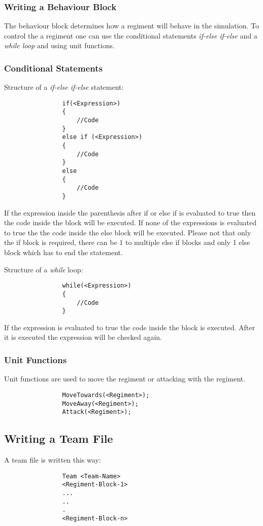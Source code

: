 		\subsubsection{Writing a Behaviour Block}
			The behaviour block determines how a regiment will behave in the simulation. To control the a regiment one can 
			use the conditional statements {\it if-else if-else} and a {\it while loop} and using unit functions.
		\subsubsection{Conditional Statements}
			Structure of a {\it if-else if-else} statement: \\
			\begin{verbatim}
				if(<Expression>)
				{
					//Code
				}
				else if (<Expression>)
				{
					//Code
				}
				else
				{
					//Code
				}
			\end{verbatim}
			If the expression inside the parenthesis after if or else if is evaluated to true then the code inside the block will be executed.
			If none of the expressions is evaluated to true the the code inside the else block will be executed. Please not that only the if block
			is required, there can be 1 to multiple else if blocks and only 1 else block which has to end the statement.
			
			Structure of a {\it while} loop: \\			
			\begin{verbatim}
				while(<Expression>)
				{
					//Code
				}
			\end{verbatim}
			If the expression is evaluated to true the code inside the block is executed. After it is executed the expression will be checked again.
		\subsubsection{Unit Functions}
			Unit functions are used to move the regiment or attacking with the regiment.
			\begin{verbatim}
				MoveTowards(<Regiment>);
				MoveAway(<Regiment>);
				Attack(<Regiment>);
			\end{verbatim}
	\subsection{Writing a Team File}
		A team file is written this way: \\
			\begin{verbatim}
				Team <Team-Name>
				<Regiment-Block-1>
				...
				..
				.
				<Regiment-Block-n>
			\end{verbatim}
		
